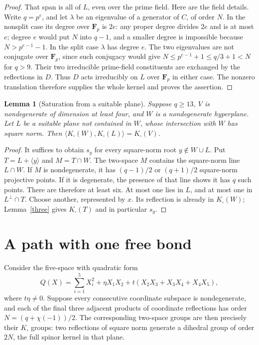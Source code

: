 \documentclass[11pt,a4paper]{article}
\newtheorem{lemma}[theorem]{Lemma}
\newcommand{\F}{\mathbf F}
\newcommand{\gen}[1]{\langle#1\rangle}
\begin{document}
\begin{proof}
That span is all of $L$, even over the prime field. Here are the
field details. Write $q=p^e$, and let $\lambda$ be an eigenvalue
of a generator of $C$, of order $N$. In the nonsplit case its
degree over $\F_p$ is $2e$: any proper degree divides $2e$ and
is at most $e$; degree $e$ would put $N$ into $q-1$, and a
smaller degree is impossible because
$N>p^{e-1}-1$. In the split case $\lambda$ has degree $e$.
The two eigenvalues are not conjugate over $\F_p$, since such
conjugacy would give $N\le p^{e-1}+1\le q/3+1<N$ for $q>9$.
Their two irreducible prime-field constituents are exchanged by
the reflections in $D$. Thus $D$ acts irreducibly on $L$ over
$\F_p$ in either case. The nonzero translation therefore supplies
the whole kernel and proves the assertion.
\end{proof}

\begin{lemma}[Saturation from a suitable plane]\label{sat}
Suppose $q\ge13$, $V$ is nondegenerate of dimension at least four,
and $W$ is a nondegenerate hyperplane. Let $L$ be a suitable plane
not contained in $W$, whose intersection with $W$ has square norm.
Then $\gen{K_\square(W),K_\square(L)}=K_\square(V)$.
\end{lemma}
\begin{proof}
It suffices to obtain $s_y$ for every square-norm root
$y\notin W\cup L$. Put $T=L+\gen y$ and $M=T\cap W$.
The two-space $M$ contains the square-norm line $L\cap W$.
If $M$ is nondegenerate, it has $(q-1)/2$ or $(q+1)/2$
square-norm projective points. If it is degenerate, the presence
of that line shows it has $q$ such points. There are therefore
at least six. At most one lies in $L$, and at most one in
$L^\perp\cap T$. Choose another, represented by $x$.
Its reflection is already in $K_\square(W)$; Lemma~\ref{three}
gives $K_\square(T)$ and in particular $s_y$.
\end{proof}

\section{A path with one free bond}
Consider the five-space with quadratic form
\[
 Q(X)=\sum_{i=1}^5 X_i^2+
       \eta X_1X_2+t(X_2X_3+X_3X_4+X_4X_5),       \tag{1}
\]
where $t\eta\ne0$. Suppose every consecutive coordinate subspace
is nondegenerate, and each of the final three adjacent products
of coordinate reflections has order $N=(q+\chi(-1))/2$.
The corresponding two-space groups are then precisely their
$K_\square$ groups: two reflections of square norm generate a
dihedral group of order $2N$, the full spinor kernel in that plane.
\end{document}
